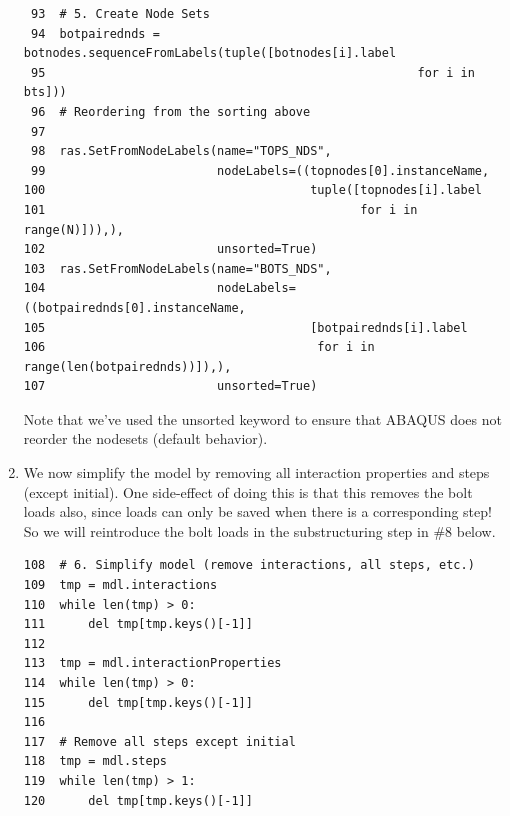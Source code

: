 \documentclass[11pt]{article}
\begin{document}
\begin{enumerate}
\begin{verbatim}
 93  # 5. Create Node Sets
 94  botpairednds = botnodes.sequenceFromLabels(tuple([botnodes[i].label
 95                                                    for i in bts]))
 96  # Reordering from the sorting above
 97  
 98  ras.SetFromNodeLabels(name="TOPS_NDS", 
 99                        nodeLabels=((topnodes[0].instanceName, 
100                                     tuple([topnodes[i].label
101                                            for i in range(N)])),),
102                        unsorted=True)
103  ras.SetFromNodeLabels(name="BOTS_NDS", 
104                        nodeLabels=((botpairednds[0].instanceName, 
105                                     [botpairednds[i].label
106                                      for i in range(len(botpairednds))]),),
107                        unsorted=True)
\end{verbatim}
Note that we've used the unsorted keyword to ensure that ABAQUS does not reorder the nodesets (default behavior).
\item We now simplify the model by removing all interaction properties and steps (except initial).
One side-effect of doing this is that this removes the bolt loads also, since loads can only be saved when there is a corresponding step!
So we will reintroduce the bolt loads in the substructuring step in \#8 below.
\begin{verbatim}
108  # 6. Simplify model (remove interactions, all steps, etc.)
109  tmp = mdl.interactions
110  while len(tmp) > 0:
111      del tmp[tmp.keys()[-1]]
112  
113  tmp = mdl.interactionProperties
114  while len(tmp) > 0:
115      del tmp[tmp.keys()[-1]]
116  
117  # Remove all steps except initial
118  tmp = mdl.steps
119  while len(tmp) > 1:
120      del tmp[tmp.keys()[-1]]
\end{verbatim}
\end{enumerate}
\end{document}
